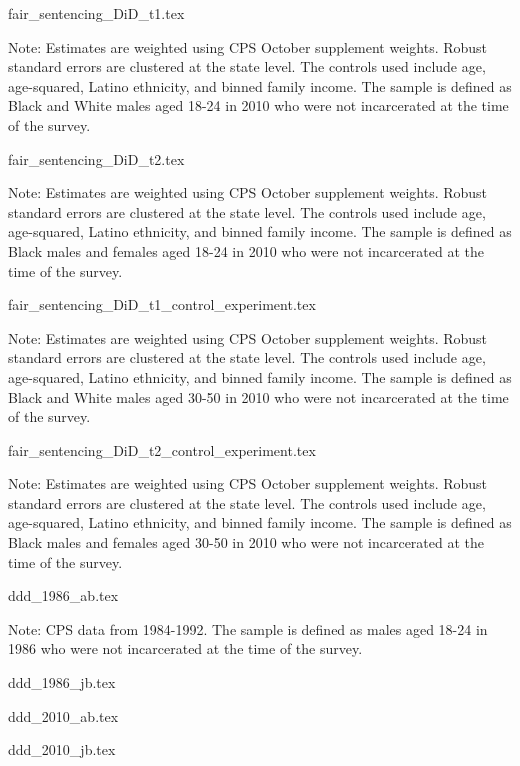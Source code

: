 {fair_sentencing_DiD_t1.tex}
\begin{footnotesize}
  \noindent Note: Estimates are weighted using CPS October supplement weights. Robust standard errors are clustered at the state level. The controls used include age, age-squared, Latino ethnicity, and binned family income. The sample is defined as Black and White males aged 18-24 in 2010 who were not incarcerated at the time of the survey.
\end{footnotesize}

{fair_sentencing_DiD_t2.tex}
\begin{footnotesize}
  \noindent Note: Estimates are weighted using CPS October supplement weights. Robust standard errors are clustered at the state level. The controls used include age, age-squared, Latino ethnicity, and binned family income. The sample is defined as Black males and females aged 18-24 in 2010 who were not incarcerated at the time of the survey.
\end{footnotesize}

{fair_sentencing_DiD_t1_control_experiment.tex}
\begin{footnotesize}
  \noindent Note: Estimates are weighted using CPS October supplement weights. Robust standard errors are clustered at the state level. The controls used include age, age-squared, Latino ethnicity, and binned family income. The sample is defined as Black and White males aged 30-50 in 2010 who were not incarcerated at the time of the survey.
\end{footnotesize}

{fair_sentencing_DiD_t2_control_experiment.tex}
\begin{footnotesize}
  \noindent Note: Estimates are weighted using CPS October supplement weights. Robust standard errors are clustered at the state level. The controls used include age, age-squared, Latino ethnicity, and binned family income. The sample is defined as Black males and females aged 30-50 in 2010 who were not incarcerated at the time of the survey.
\end{footnotesize}
\clearpage

{ddd_1986_ab.tex}
\begin{footnotesize}
  \noindent Note: CPS data from 1984-1992.
  The sample is defined as males aged 18-24 in 1986 who were not incarcerated at the time of the survey.
\end{footnotesize}

\clearpage

{ddd_1986_jb.tex}

\clearpage

{ddd_2010_ab.tex}

\clearpage

{ddd_2010_jb.tex}
\clearpage 
